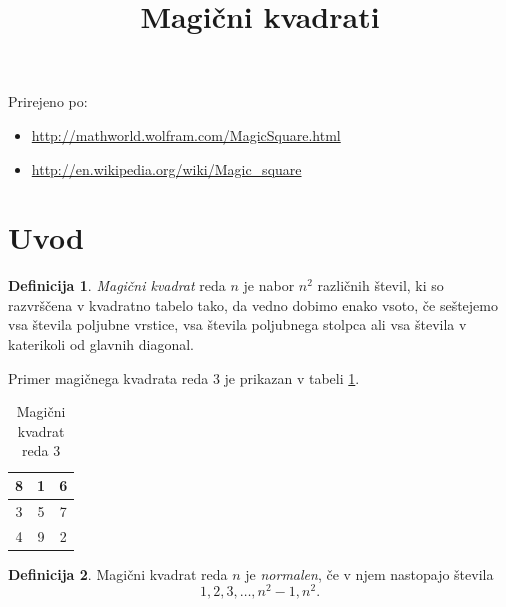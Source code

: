 \documentclass[a4paper,12pt]{article}
\title{Magični kvadrati}
\author{}
\date{}
\theoremstyle{definition}
\newtheorem{definicija}{Definicija}
\begin{document}
\maketitle

Prirejeno po:

\begin{itemize}
   \item \url{http://mathworld.wolfram.com/MagicSquare.html}
   \item \url{http://en.wikipedia.org/wiki/Magic_square}
\end{itemize}
\tableofcontents


\newpage

\section{Uvod}

 \begin{definicija}
   \emph{Magični kvadrat} reda \(n\) je nabor \(n^2\) različnih števil,
   ki so razvrščena v kvadratno tabelo tako, da vedno dobimo enako vsoto,
   če seštejemo vsa števila poljubne vrstice, vsa števila poljubnega
   stolpca ali vsa števila v katerikoli od glavnih diagonal.
 \end{definicija}

Primer magičnega kvadrata reda 3 je prikazan v tabeli \ref{table:mag3}.  %
\begin{table}[h]
   \centering
   \caption{Magični kvadrat reda 3}
   \begin{tabular}{|c|c|c|}
      \hline
   8 & 1 & 6 \\ \hline
   3 & 5 & 7 \\ \hline
   4 & 9 & 2 \\ \hline
\end{tabular}
\label{table:mag3}
\end{table}
 \begin{definicija}
   Magični kvadrat reda \(n\) je \emph{normalen}, če v njem nastopajo števila
   \begin{equation}
       \label{eq:numbers}
      1, 2, 3, \ldots, n^2-1, n^2.
   \end{equation}
 \end{definicija}
\end{document}
